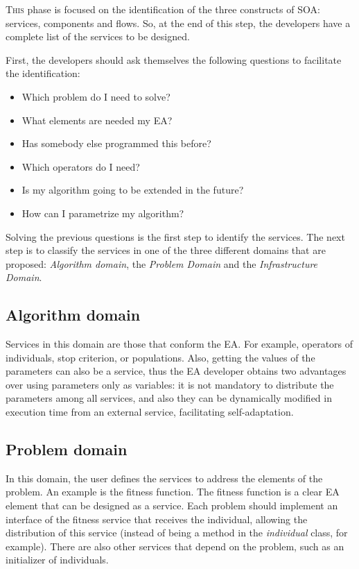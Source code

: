 \lettrine{T}{his} phase is focused on the identification of the three constructs of SOA: services, components and flows. So, at the end of this step, the developers have a complete list of the services to be designed.

First, the developers should ask themselves the following questions to facilitate the identification:
\begin{itemize}
\item Which problem do I need to solve?
\item What elements are needed my EA?
\item Has somebody else programmed this before?
\item Which operators do I need?
\item Is my algorithm going to be extended in the future?
\item How can I parametrize my algorithm?
\end{itemize}

Solving the previous questions is the first step to identify the services. The next step is to classify the services in one of the three different domains that are proposed: {\em Algorithm domain}, the {\em Problem Domain} and the {\em Infrastructure Domain}. 

\subsection{Algorithm domain} Services in this domain are those that conform the EA. For example, operators of individuals, stop criterion, or populations.
 Also, getting the values of the parameters can also be a
  service,  thus the EA developer obtains two advantages over using parameters only as variables: 
it is not mandatory to distribute the parameters among all services, and also they can be dynamically modified in execution time from an external service, facilitating self-adaptation.

\subsection{Problem domain} In this domain, the user defines the services to address the elements of the problem. An example is the fitness function. The fitness function is a clear EA element that can be designed as a service. Each problem should implement an interface
  of the fitness service that receives the individual, allowing the
  distribution of this service (instead of being a method in the {\em individual} class, for example). There are also other services that depend on the problem, such as an initializer of individuals.

